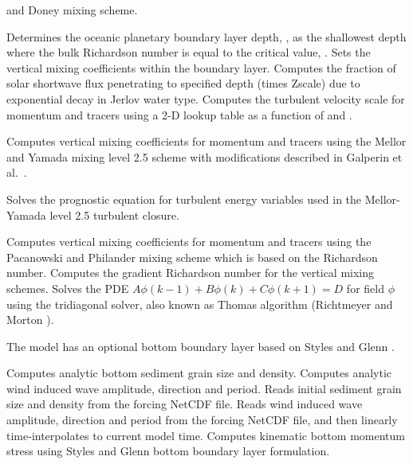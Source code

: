 \begin{klist}
\begin{klist}
   and Doney \cite{Large94} mixing scheme.
     \begin{klist}
      Determines the oceanic planetary boundary
   layer depth,  , as the shallowest depth where the bulk
   Richardson number is equal to the critical value, .
       Sets the vertical mixing coefficients within
   the boundary layer.
      Computes the  fraction  of  solar shortwave
   flux penetrating to specified depth (times Zscale) due to
   exponential decay in Jerlov water type.
      Computes the turbulent velocity scale for
   momentum and tracers using a 2-D lookup table as a function of
    and .
     \end{klist}
       Computes vertical mixing coefficients for
   momentum and tracers using the Mellor and Yamada \cite{Mellor74}
   mixing level 2.5 scheme with modifications described in Galperin et
   al.\ \cite{Galperin88}.
     \begin{klist}
        Solves the prognostic equation for turbulent
   energy variables used in the  Mellor-Yamada level 2.5
   turbulent closure.
     \end{klist}
        Computes vertical mixing coefficients for
   momentum and tracers using the  Pacanowski and Philander
   \cite{Pacanowski81} mixing scheme which is based on the Richardson
   number.
      Computes the gradient Richardson number for
   the vertical mixing schemes.
       Solves the PDE
   $A \phi(k-1) + B \phi(k) + C \phi(k+1) = D$
     for field $\phi$ using the tridiagonal solver, also known as
  Thomas algorithm (Richtmeyer and Morton \cite{Richtmeyer}).
   \end{klist}
 The model has an optional bottom
boundary layer based on Styles and Glenn \cite{Styles96}.
   \begin{klist}
       Computes analytic bottom sediment grain
   size and density.
        Computes analytic wind induced wave
   amplitude, direction and period.
       Reads initial sediment grain size and
   density from the forcing NetCDF file.
       Reads wind induced wave amplitude, direction
   and period from the forcing NetCDF file, and then linearly
   time-interpolates to current model time.
       Computes kinematic bottom momentum stress using
   Styles and Glenn \cite{Styles96} bottom boundary layer formulation.

\end{klist}
\end{klist}
